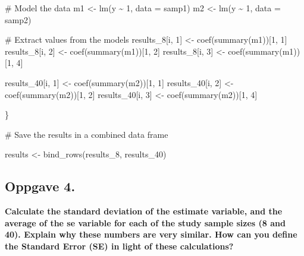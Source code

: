 \documentclass[
  letterpaper,
  DIV=11,
  numbers=noendperiod]{scrreprt}
\newenvironment{Shaded}{\begin{snugshade}}{\end{snugshade}}
\newcommand{\AttributeTok}[1]{\textcolor[rgb]{0.40,0.45,0.13}{#1}}
\newcommand{\CommentTok}[1]{\textcolor[rgb]{0.37,0.37,0.37}{#1}}
\newcommand{\DecValTok}[1]{\textcolor[rgb]{0.68,0.00,0.00}{#1}}
\newcommand{\FunctionTok}[1]{\textcolor[rgb]{0.28,0.35,0.67}{#1}}
\newcommand{\NormalTok}[1]{\textcolor[rgb]{0.00,0.23,0.31}{#1}}
\newcommand{\OtherTok}[1]{\textcolor[rgb]{0.00,0.23,0.31}{#1}}
\newcommand{\SpecialCharTok}[1]{\textcolor[rgb]{0.37,0.37,0.37}{#1}}
\begin{document}
\begin{Shaded}
\begin{Highlighting}[]
  \CommentTok{\# Model the data}
\NormalTok{  m1 }\OtherTok{\textless{}{-}} \FunctionTok{lm}\NormalTok{(y }\SpecialCharTok{\textasciitilde{}} \DecValTok{1}\NormalTok{, }\AttributeTok{data =}\NormalTok{ samp1)}
\NormalTok{  m2 }\OtherTok{\textless{}{-}} \FunctionTok{lm}\NormalTok{(y }\SpecialCharTok{\textasciitilde{}} \DecValTok{1}\NormalTok{, }\AttributeTok{data =}\NormalTok{ samp2)}
  
  \CommentTok{\# Extract values from the models}
\NormalTok{  results\_8[i, }\DecValTok{1}\NormalTok{] }\OtherTok{\textless{}{-}} \FunctionTok{coef}\NormalTok{(}\FunctionTok{summary}\NormalTok{(m1))[}\DecValTok{1}\NormalTok{, }\DecValTok{1}\NormalTok{]}
\NormalTok{  results\_8[i, }\DecValTok{2}\NormalTok{] }\OtherTok{\textless{}{-}} \FunctionTok{coef}\NormalTok{(}\FunctionTok{summary}\NormalTok{(m1))[}\DecValTok{1}\NormalTok{, }\DecValTok{2}\NormalTok{]}
\NormalTok{  results\_8[i, }\DecValTok{3}\NormalTok{] }\OtherTok{\textless{}{-}} \FunctionTok{coef}\NormalTok{(}\FunctionTok{summary}\NormalTok{(m1))[}\DecValTok{1}\NormalTok{, }\DecValTok{4}\NormalTok{]}

\NormalTok{  results\_40[i, }\DecValTok{1}\NormalTok{] }\OtherTok{\textless{}{-}} \FunctionTok{coef}\NormalTok{(}\FunctionTok{summary}\NormalTok{(m2))[}\DecValTok{1}\NormalTok{, }\DecValTok{1}\NormalTok{]}
\NormalTok{  results\_40[i, }\DecValTok{2}\NormalTok{] }\OtherTok{\textless{}{-}} \FunctionTok{coef}\NormalTok{(}\FunctionTok{summary}\NormalTok{(m2))[}\DecValTok{1}\NormalTok{, }\DecValTok{2}\NormalTok{]}
\NormalTok{  results\_40[i, }\DecValTok{3}\NormalTok{] }\OtherTok{\textless{}{-}} \FunctionTok{coef}\NormalTok{(}\FunctionTok{summary}\NormalTok{(m2))[}\DecValTok{1}\NormalTok{, }\DecValTok{4}\NormalTok{]}
  
  
\NormalTok{\}}


\CommentTok{\# Save the results in a combined data frame}

\NormalTok{results }\OtherTok{\textless{}{-}} \FunctionTok{bind\_rows}\NormalTok{(results\_8, results\_40)}
\end{Highlighting}
\end{Shaded}

\subsection{Oppgave 4.}\label{oppgave-4.}

\textbf{Calculate the standard deviation of the estimate variable, and
the average of the se variable for each of the study sample sizes (8 and
40). Explain why these numbers are very similar. How can you define the
Standard Error (SE) in light of these calculations?}
\end{document}
